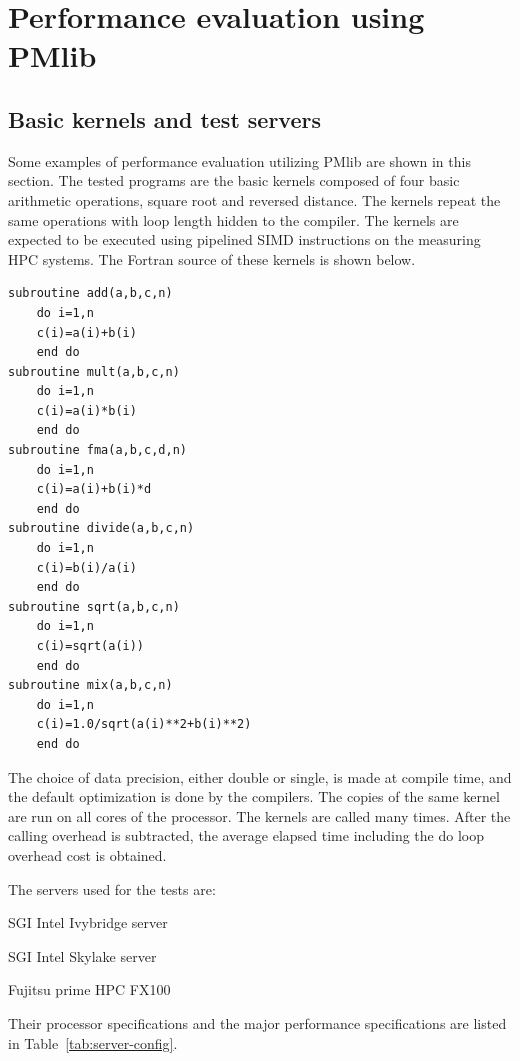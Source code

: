 \documentclass[conference]{IEEEtran}
\begin{document}
\section{Performance evaluation using PMlib}
\label{section:using-PMlib}

\subsection{Basic kernels and test servers}
\label{subsection:basic-kernels}

Some examples of performance evaluation utilizing PMlib are shown in this section.
The tested programs are the basic kernels composed of
four basic arithmetic operations, square root and reversed distance.
The kernels repeat the same operations with loop length hidden to the compiler.
The kernels are expected to be executed using pipelined SIMD instructions
on the measuring HPC systems.
%
The Fortran source of these kernels is shown below.
\begin{lstlisting}
subroutine add(a,b,c,n)
	do i=1,n
	c(i)=a(i)+b(i)
	end do
subroutine mult(a,b,c,n)
	do i=1,n
	c(i)=a(i)*b(i)
	end do
subroutine fma(a,b,c,d,n)
	do i=1,n
	c(i)=a(i)+b(i)*d
	end do
subroutine divide(a,b,c,n)
	do i=1,n
	c(i)=b(i)/a(i)
	end do
subroutine sqrt(a,b,c,n)
	do i=1,n
	c(i)=sqrt(a(i))
	end do
subroutine mix(a,b,c,n)
	do i=1,n
	c(i)=1.0/sqrt(a(i)**2+b(i)**2)
	end do
\end{lstlisting}

The choice of data precision, either double or single, is made at compile time,
and the default optimization is done by the compilers.
The copies of the same kernel are run on all cores of the processor.
The kernels are called many times.  After the calling overhead is subtracted,
the average elapsed time including the do loop overhead cost is obtained.


The servers used for the tests are:
\begin{itemize}
{
\item SGI Intel Ivybridge server
\item SGI Intel Skylake server
\item Fujitsu prime HPC FX100
}
\end{itemize}
Their processor specifications and the major performance specifications
are listed in Table~\ref{tab:server-config}.
\end{document}
